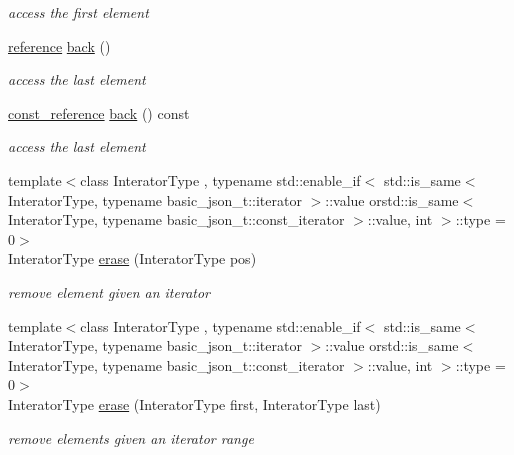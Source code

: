 \begin{DoxyCompactItemize}
\begin{DoxyCompactList}\small\item\em access the first element \end{DoxyCompactList}\item 
\hyperlink{classnlohmann_1_1basic__json_a3ec8e17be8732fe436e9d6733f52b7a3}{reference} \hyperlink{classnlohmann_1_1basic__json_a71b1d38ef402dfee58fba1fe01fa67f5}{back} ()
\begin{DoxyCompactList}\small\item\em access the last element \end{DoxyCompactList}\item 
\hyperlink{classnlohmann_1_1basic__json_af677a29b0e66edc9f66e5167e4667071}{const\-\_\-reference} \hyperlink{classnlohmann_1_1basic__json_a098482190447461f47f80b99bf2519f6}{back} () const 
\begin{DoxyCompactList}\small\item\em access the last element \end{DoxyCompactList}\item 
{\footnotesize template$<$class Interator\-Type , typename std\-::enable\-\_\-if$<$ std\-::is\-\_\-same$<$ Interator\-Type, typename basic\-\_\-json\-\_\-t\-::iterator $>$\-::value orstd\-::is\-\_\-same$<$ Interator\-Type, typename basic\-\_\-json\-\_\-t\-::const\-\_\-iterator $>$\-::value, int $>$\-::type  = 0$>$ }\\Interator\-Type \hyperlink{classnlohmann_1_1basic__json_a45e789042a23138eba2b69f34df9fc45}{erase} (Interator\-Type pos)
\begin{DoxyCompactList}\small\item\em remove element given an iterator \end{DoxyCompactList}\item 
{\footnotesize template$<$class Interator\-Type , typename std\-::enable\-\_\-if$<$ std\-::is\-\_\-same$<$ Interator\-Type, typename basic\-\_\-json\-\_\-t\-::iterator $>$\-::value orstd\-::is\-\_\-same$<$ Interator\-Type, typename basic\-\_\-json\-\_\-t\-::const\-\_\-iterator $>$\-::value, int $>$\-::type  = 0$>$ }\\Interator\-Type \hyperlink{classnlohmann_1_1basic__json_a263a9ecde33a1f2ff63dcd15d5e42cb7}{erase} (Interator\-Type first, Interator\-Type last)
\begin{DoxyCompactList}\small\item\em remove elements given an iterator range \end{DoxyCompactList}\item 

\end{DoxyCompactItemize}
